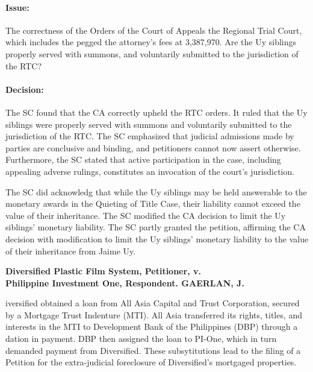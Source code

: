 \documentclass[
12pt,
oneside,
onehalfspacing,
headsepline
]{DigestCollection}
\begin{document}
\paragraph{Issue:}
\label{98bf8980-09fd-11ef-932c-63c852f65e48}


 The correctness of the Orders of the Court of Appeals the Regional Trial Court, which includes the pegged the attorney's fees at 3,387,970. Are the Uy siblings properly served with summons, and voluntarily submitted to the jurisdiction of the RTC?

\paragraph{Decision:}
\label{9a28b670-09fd-11ef-932c-63c852f65e48}


The SC found that the CA correctly upheld the RTC orders. It ruled that the Uy siblings were properly served with summons and voluntarily submitted to the jurisdiction of the RTC. The SC emphasized that judicial admissions made by parties are conclusive and binding, and petitioners cannot now assert otherwise. Furthermore, the SC stated that active participation in the case, including appealing adverse rulings, constitutes an invocation of the court's jurisdiction.

The SC did acknowledg that while the Uy siblings may be held answerable to the monetary awards in the Quieting of Title Case, their liability cannot exceed the value of their inheritance. The SC modified the CA decision to limit the Uy siblings' monetary liability. The SC partly granted the petition, affirming the CA decision with modification to limit the Uy siblings' monetary liability to the value of their inheritance from Jaime Uy.

\label{d48ea4c0-0a0f-11ef-932c-63c852f65e48}


\noindent\textbf{Diversified Plastic Film System, Petitioner, v. \\Philippine Investment One, Respondent. GAERLAN, J.}\vspace{0.4cm}

iversified obtained a loan from All Asia Capital and Trust Corporation, secured by a Mortgage Trust Indenture (MTI). All Asia transferred its rights, titles, and interests in the MTI to Development Bank of the Philippines (DBP) through a dation in payment. DBP then assigned the loan to PI-One, which in turn demanded payment from Diversified. These subsytitutions lead to the filing of a Petition for the extra-judicial foreclosure of Diversified's mortgaged properties.
\end{document}
